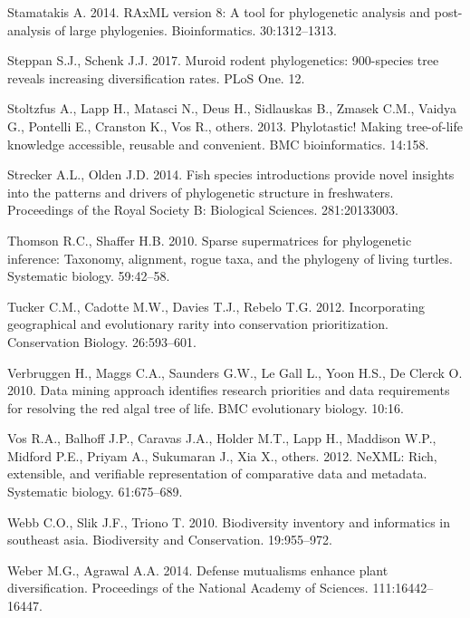 \documentclass[]{article}
\begin{document}
\leavevmode\hypertarget{ref-stamatakis2014raxml}{}%
Stamatakis A. 2014. RAxML version 8: A tool for phylogenetic analysis and post-analysis of large phylogenies. Bioinformatics. 30:1312--1313.

\leavevmode\hypertarget{ref-steppan2017muroid}{}%
Steppan S.J., Schenk J.J. 2017. Muroid rodent phylogenetics: 900-species tree reveals increasing diversification rates. PLoS One. 12.

\leavevmode\hypertarget{ref-stoltzfus2013phylotastic}{}%
Stoltzfus A., Lapp H., Matasci N., Deus H., Sidlauskas B., Zmasek C.M., Vaidya G., Pontelli E., Cranston K., Vos R., others. 2013. Phylotastic! Making tree-of-life knowledge accessible, reusable and convenient. BMC bioinformatics. 14:158.

\leavevmode\hypertarget{ref-strecker2014fish}{}%
Strecker A.L., Olden J.D. 2014. Fish species introductions provide novel insights into the patterns and drivers of phylogenetic structure in freshwaters. Proceedings of the Royal Society B: Biological Sciences. 281:20133003.

\leavevmode\hypertarget{ref-thomson2010sparse}{}%
Thomson R.C., Shaffer H.B. 2010. Sparse supermatrices for phylogenetic inference: Taxonomy, alignment, rogue taxa, and the phylogeny of living turtles. Systematic biology. 59:42--58.

\leavevmode\hypertarget{ref-tucker2012incorporating}{}%
Tucker C.M., Cadotte M.W., Davies T.J., Rebelo T.G. 2012. Incorporating geographical and evolutionary rarity into conservation prioritization. Conservation Biology. 26:593--601.

\leavevmode\hypertarget{ref-verbruggen2010data}{}%
Verbruggen H., Maggs C.A., Saunders G.W., Le Gall L., Yoon H.S., De Clerck O. 2010. Data mining approach identifies research priorities and data requirements for resolving the red algal tree of life. BMC evolutionary biology. 10:16.

\leavevmode\hypertarget{ref-vos2012nexml}{}%
Vos R.A., Balhoff J.P., Caravas J.A., Holder M.T., Lapp H., Maddison W.P., Midford P.E., Priyam A., Sukumaran J., Xia X., others. 2012. NeXML: Rich, extensible, and verifiable representation of comparative data and metadata. Systematic biology. 61:675--689.

\leavevmode\hypertarget{ref-webb2010biodiversity}{}%
Webb C.O., Slik J.F., Triono T. 2010. Biodiversity inventory and informatics in southeast asia. Biodiversity and Conservation. 19:955--972.

\leavevmode\hypertarget{ref-weber2014defense}{}%
Weber M.G., Agrawal A.A. 2014. Defense mutualisms enhance plant diversification. Proceedings of the National Academy of Sciences. 111:16442--16447.
\end{document}
